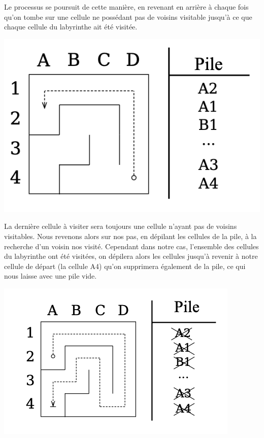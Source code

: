 \begin{minipage}{0.6\textwidth}
Le processus se poursuit de cette manière, en revenant en arrière à chaque fois qu'on tombe sur une cellule ne possédant pas de voisins visitable jusqu'à ce que chaque cellule du labyrinthe ait été visitée.
\end{minipage}
\begin{minipage}{0.4\textwidth}
\includegraphics[width=\linewidth]{pics/backtracking7.png}
\end{minipage}


\begin{minipage}{0.6\textwidth}
La dernière cellule à visiter sera toujours une cellule n'ayant pas de voisins visitables. Nous revenons alors sur nos pas, en dépilant les cellules de la pile, à la recherche d'un voisin nos visité. Cependant dans notre cas, l'ensemble des cellules du labyrinthe ont été visitées, on dépilera alors les cellules jusqu'à revenir à notre cellule de départ (la cellule A4) qu'on supprimera également de la pile, ce qui nous laisse avec une pile vide.
\end{minipage}
\begin{minipage}{0.4\textwidth}
\includegraphics[width=\linewidth]{pics/backtracking9.png}
\end{minipage}

